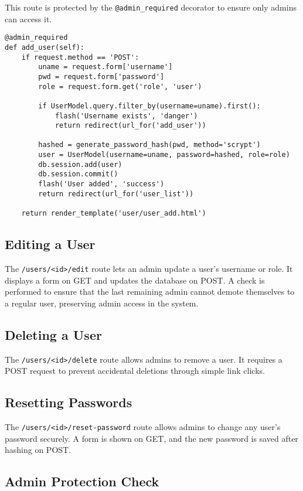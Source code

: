 \documentclass[12pt]{article}
\begin{document}
\noindent This route is protected by the \texttt{@admin\_required} decorator to ensure only admins can access it.

\begin{verbatim}
@admin_required
def add_user(self):
    if request.method == 'POST':
        uname = request.form['username']
        pwd = request.form['password']
        role = request.form.get('role', 'user')

        if UserModel.query.filter_by(username=uname).first():
            flash('Username exists', 'danger')
            return redirect(url_for('add_user'))

        hashed = generate_password_hash(pwd, method='scrypt')
        user = UserModel(username=uname, password=hashed, role=role)
        db.session.add(user)
        db.session.commit()
        flash('User added', 'success')
        return redirect(url_for('user_list'))

    return render_template('user/user_add.html')
\end{verbatim}

\subsection*{Editing a User}

The \texttt{/users/<id>/edit} route lets an admin update a user’s username or role. It displays a form on GET and updates the database on POST. A check is performed to ensure that the last remaining admin cannot demote themselves to a regular user, preserving admin access in the system.

\subsection*{Deleting a User}

The \texttt{/users/<id>/delete} route allows admins to remove a user. It requires a POST request to prevent accidental deletions through simple link clicks.

\subsection*{Resetting Passwords}

The \texttt{/users/<id>/reset-password} route allows admins to change any user's password securely. A form is shown on GET, and the new password is saved after hashing on POST.

\subsection*{Admin Protection Check}
\end{document}
